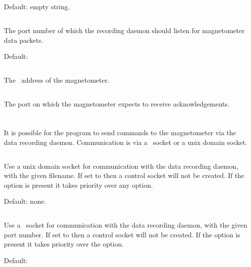 {  Default: empty string.

  \subsection{}
  The port number of which the recording
  daemon should listen for magnetometer data packets.

  Default: 

  \subsection{}
  The \ip\ address of the magnetometer.

  \subsection{}
  The port on which the magnetometer expects to receive
  acknowledgements.  
}{}


\section{\code{[controlsocket]}}

It is possible for the  program to send commands
to the magnetometer via the data recording daemon. Communication is
via a \udp\ socket or a unix domain socket.

\subsection{}
Use a unix domain socket for communication with the data recording
daemon, with the given filename. If set to  then a
control socket will not be created. If the  option is
present it takes priority over any  option.

Default: none.

\subsection{}
Use a \udp\ socket for communication with the data recording
daemon, with the given port number. If set to  then a
control socket will not be created. If the  option is
present it takes priority over the  option.

Default: 



